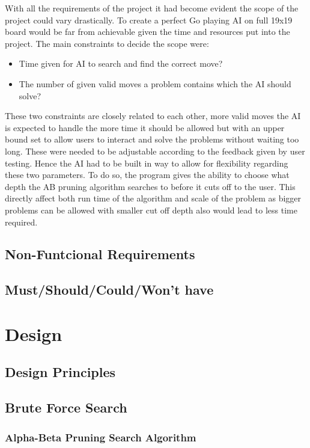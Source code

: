 \documentclass{l4proj}
\begin{document}
With all the requirements of the project it had become evident the scope of the project could vary drastically. To create a perfect Go playing AI on full 19x19 board would be far from achievable given the time and resources put into the project. The main constraints to decide the scope were:
\begin{itemize}
	\item Time given for AI to search and find the correct move?
	\item The number of given valid moves a problem contains which the AI should solve?
\end{itemize}
These two constraints are closely related to each other, more valid moves the AI is expected to handle the more time it should be allowed but with an upper bound set to allow users to interact and solve the problems without waiting too long. These were needed to be adjustable according to the feedback given by user testing. Hence the AI had to be built in way to allow for flexibility regarding these two parameters. To do so, the program gives the ability to choose what depth the AB pruning algorithm searches to before it cuts off to the user. This directly affect both run time of the algorithm and scale of the problem as bigger problems can be allowed with smaller cut off depth also would lead to less time required.


\section{Non-Funtcional Requirements}

\section{Must/Should/Could/Won't have}




\chapter{Design}

\section{Design Principles}

\section{Brute Force Search}
\subsection{Alpha-Beta Pruning Search Algorithm}
\end{document}

